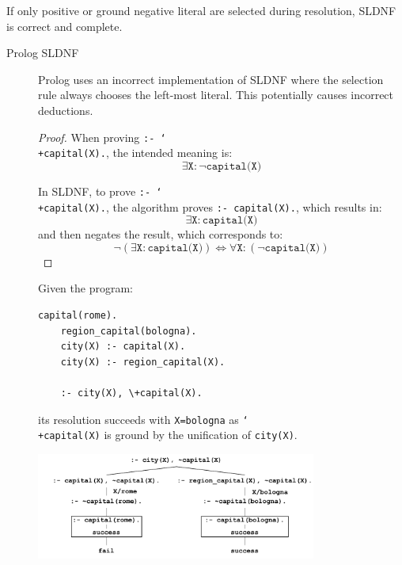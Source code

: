 \begin{description}
        \begin{theorem}
            If only positive or ground negative literal are selected during resolution, SLDNF is correct and complete.
        \end{theorem}

        \begin{description}
            \item[Prolog SLDNF] 
                Prolog uses an incorrect implementation of SLDNF where the selection rule always chooses the left-most literal.
                This potentially causes incorrect deductions.

                \begin{proof}
                    When proving \texttt{:- \char`\\+capital(X).}, the intended meaning is:
                    \[ \exists \texttt{X}: \lnot \texttt{capital(X)}  \]

                    In SLDNF, to prove \texttt{:- \char`\\+capital(X).}, the algorithm proves \texttt{:- capital(X).}, which results in:
                    \[ \exists \texttt{X}: \texttt{capital(X)}  \]
                    and then negates the result, which corresponds to:
                    \[ \lnot (\exists \texttt{X}: \texttt{capital(X)}) \iff \forall \texttt{X}: (\lnot \texttt{capital(X)}) \]

                \end{proof}

                \begin{example}
                    Given the program:
                    \begin{lstlisting}[language={}, mathescape=true]
    capital(rome).
    region_capital(bologna).
    city(X) :- capital(X).
    city(X) :- region_capital(X).

    :- city(X), \+capital(X).
                    \end{lstlisting}
                    its resolution succeeds with \texttt{X=bologna} as \texttt{\char`\\+capital(X)} is ground by the unification of \texttt{city(X)}.
                    \begin{center}
                        \includegraphics[width=0.75\textwidth]{img/_sldnf_correct_example.pdf}
                    \end{center}
                \end{example}


\end{description}
\end{description}
